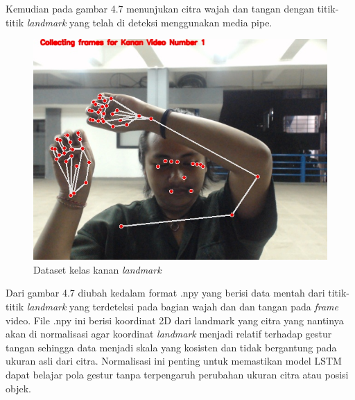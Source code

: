 Kemudian pada gambar 4.7 menunjukan citra wajah dan tangan dengan titik-titik \emph{landmark} yang telah di deteksi menggunakan media pipe.
\begin{figure} [H] \centering
  \includegraphics[scale=0.2]{gambar/1.jpg}
  \caption{Dataset kelas kanan \emph{landmark}}
  \label{fig:dataset kelas kanan clear}
\end{figure}
Dari gambar 4.7 diubah kedalam format .npy yang berisi data mentah dari titik-titik \emph{landmark}
yang terdeteksi pada bagian wajah dan dan tangan pada \emph{frame} video. File .npy ini berisi koordinat
2D dari landmark yang citra yang nantinya akan di normalisasi agar koordinat \emph{landmark} menjadi relatif 
terhadap gestur tangan sehingga data menjadi skala yang kosisten dan tidak bergantung pada ukuran asli dari citra. 
Normalisasi ini penting untuk memastikan model LSTM dapat belajar pola gestur tanpa terpengaruh perubahan ukuran citra atau posisi objek.
